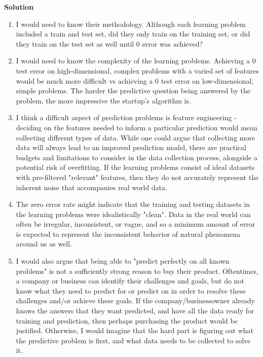 \documentclass[11pt]{article}
\begin{document}
\textbf{Solution}

\begin{enumerate}
\def\labelenumi{\arabic{enumi})}
\item
  I would need to know their methodology. Although each learning problem
  included a train and test set, did they only train on the training
  set, or did they train on the test set as well until 0 error was
  achieved?
\item
  I would need to know the complexity of the learning problems.
  Achieving a 0 test error on high-dimensional, complex problems with a
  varied set of features would be much more difficult vs achieving a 0
  test error on low-dimensional, simple problems. The harder the
  predictive question being answered by the problem, the more impressive
  the startup's algorithm is.
\item
  I think a difficult aspect of prediction problems is feature
  engineering - deciding on the features needed to inform a particular
  prediction would mean collecting different types of data. While one
  could argue that collecting more data will always lead to an improved
  prediction model, there are practical budgets and limitations to
  consider in the data collection process, alongside a potential risk of
  overfitting. If the learning problems consist of ideal datasets with
  pre-filtered "relevant" features, then they do not accurately
  represent the inherent noise that accompanies real world data.
\item
  The zero error rate might indicate that the training and testing
  datasets in the learning problems were idealistically "clean". Data in
  the real world can often be irregular, inconsistent, or vague, and so
  a minimum amount of error is expected to represent the inconsistent
  behavior of natural phenomena around us as well.
\item
  I would also argue that being able to "predict perfectly on all known
  problems" is not a sufficiently strong reason to buy their product.
  Oftentimes, a company or business can identify their challenges and
  goals, but do not know what they need to predict for or predict on in
  order to resolve these challenges and/or achieve these goals. If the
  company/businessowner already knows the answers that they want
  predicted, and have all the data ready for training and prediction,
  then perhaps purchasing the product would be justified. Otherwise, I
  would imagine that the hard part is figuring out what the predictive
  problem is first, and what data needs to be collected to solve it.
\end{enumerate}
\pagebreak
\end{document}
